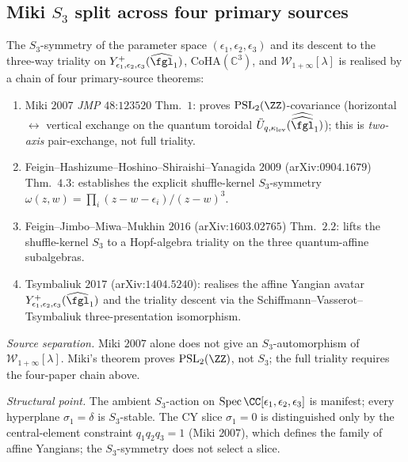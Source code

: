 \subsection{Miki $S_3$ split across four primary sources}
\label{wn:subsec:second-pass-miki-split}

\begin{theorem}
\label{wn:thm:second-pass-miki-four}

The $S_3$-symmetry of the parameter space
$(\epsilon_1, \epsilon_2, \epsilon_3)$ and its descent to the
three-way triality on $Y^+_{\epsilon_1, \epsilon_2, \epsilon_3}
(\widehat{\fgl}_1)$, $\mathrm{CoHA}(\mathbb{C}^3)$, and
$\mathcal{W}_{1+\infty}[\lambda]$ is realised by a chain of four
primary-source theorems:
\begin{enumerate}
\item Miki $2007$ \emph{JMP} $48$:$123520$ Thm.~$1$: proves
$\mathrm{PSL}_2(\ZZ)$-covariance (horizontal $\leftrightarrow$ vertical
exchange on the quantum toroidal $\ddot{U}_{q, \kappa_{\mathrm{lev}}}
(\widehat{\widehat{\fgl}}_1)$); this is \emph{two-axis}
pair-exchange, not full triality.
\item Feigin--Hashizume--Hoshino--Shiraishi--Yanagida $2009$
(arXiv:$0904.1679$) Thm.~$4.3$: establishes the explicit shuffle-kernel
$S_3$-symmetry
$\omega(z, w) = \prod_i (z - w - \epsilon_i)/(z - w)^3$.
\item Feigin--Jimbo--Miwa--Mukhin $2016$
(arXiv:$1603.02765$) Thm.~$2.2$: lifts the shuffle-kernel $S_3$ to a
Hopf-algebra triality on the three quantum-affine subalgebras.
\item Tsymbaliuk $2017$ (arXiv:$1404.5240$): realises the affine
Yangian avatar $Y^+_{\epsilon_1, \epsilon_2, \epsilon_3}
(\widehat{\fgl}_1)$ and the triality descent via the
Schiffmann--Vasserot--Tsymbaliuk three-presentation isomorphism.
\end{enumerate}

\emph{Source separation.} Miki $2007$ alone does not give an
$S_3$-automorphism of $\mathcal{W}_{1+\infty}[\lambda]$. Miki's theorem proves
$\mathrm{PSL}_2(\ZZ)$, not $S_3$; the full triality requires the
four-paper chain above.

\emph{Structural point.} The ambient $S_3$-action on
$\mathrm{Spec}\,\CC[\epsilon_1, \epsilon_2, \epsilon_3]$ is manifest;
every hyperplane $\sigma_1 = \delta$ is $S_3$-stable. The CY slice
$\sigma_1 = 0$ is distinguished only by the central-element constraint
$q_1 q_2 q_3 = 1$ (Miki $2007$), which defines the family of affine
Yangians; the $S_3$-symmetry does not select a slice.
\end{theorem}

